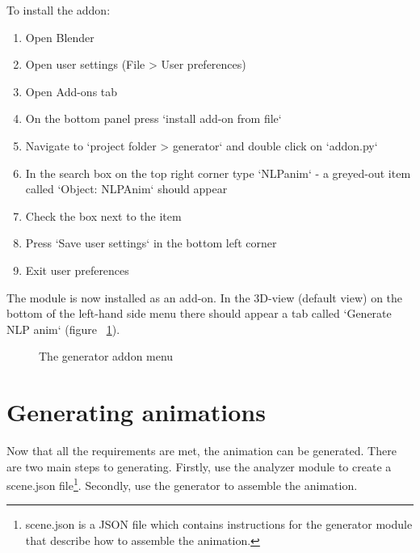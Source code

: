 \noindent To install the addon:
\begin{enumerate}
	\item Open Blender
	\item Open user settings (File > User preferences)
	\item Open Add-ons tab
	\item On the bottom panel press `install add-on from file`
	\item Navigate to `project folder > generator` and double click on `addon.py`
	\item In the search box on the top right corner type `NLPanim` - a greyed-out item called `Object: NLPAnim` should appear
	\item Check the box next to the item
	\item Press `Save user settings` in the bottom left corner
	\item Exit user preferences
\end{enumerate}

\noindent The module is now installed as an add-on. In the 3D-view (default view) on the bottom of the left-hand side menu there should appear a tab called `Generate NLP anim` (figure ~\ref{fig:installedaddon}).
	
\begin{figure}[!ht]
	\centerline{}
	\caption{The generator addon menu}\label{fig:installedaddon}
\end{figure}

\section{Generating animations \label{sec:generatormanual}}
\noindent Now that all the requirements are met, the animation can be generated. There are two main steps to generating. Firstly, use the analyzer module to create a scene.json file\footnote{scene.json is a JSON file which contains instructions for the generator module that describe how to assemble the animation.}. Secondly, use the generator to assemble the animation.

